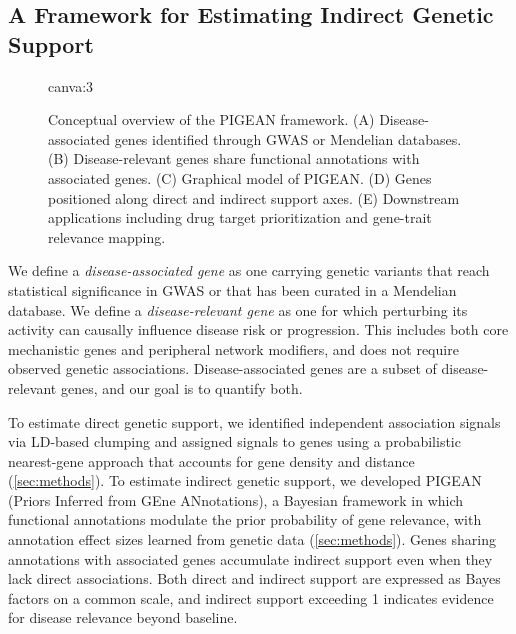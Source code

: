 \subsection{A Framework for Estimating Indirect Genetic Support}

\begin{figure}[h!]
    \centering
    {{canva:3}}
    \caption{Conceptual overview of the PIGEAN framework. (A) Disease-associated genes identified through GWAS or Mendelian databases. (B) Disease-relevant genes share functional annotations with associated genes. (C) Graphical model of PIGEAN. (D) Genes positioned along direct and indirect support axes. (E) Downstream applications including drug target prioritization and gene-trait relevance mapping.}
    \label{fig:pigean-method}
\end{figure}

We define a \textit{disease-associated gene} as one carrying genetic variants that reach statistical significance in GWAS or that has been curated in a Mendelian database. We define a \textit{disease-relevant gene} as one for which perturbing its activity can causally influence disease risk or progression. This includes both core mechanistic genes and peripheral network modifiers, and does not require observed genetic associations. Disease-associated genes are a subset of disease-relevant genes, and our goal is to quantify both.

To estimate direct genetic support, we identified independent association signals via LD-based clumping \cite{purcell_plink_2007} and assigned signals to genes using a probabilistic nearest-gene approach that accounts for gene density and distance \cite{dornbos_evaluating_2022} (\ref{sec:methods}). To estimate indirect genetic support, we developed PIGEAN (Priors Inferred from GEne ANnotations), a Bayesian framework in which functional annotations modulate the prior probability of gene relevance, with annotation effect sizes learned from genetic data (\ref{sec:methods}). Genes sharing annotations with associated genes accumulate indirect support even when they lack direct associations. Both direct and indirect support are expressed as Bayes factors on a common scale, and indirect support exceeding 1 indicates evidence for disease relevance beyond baseline.

